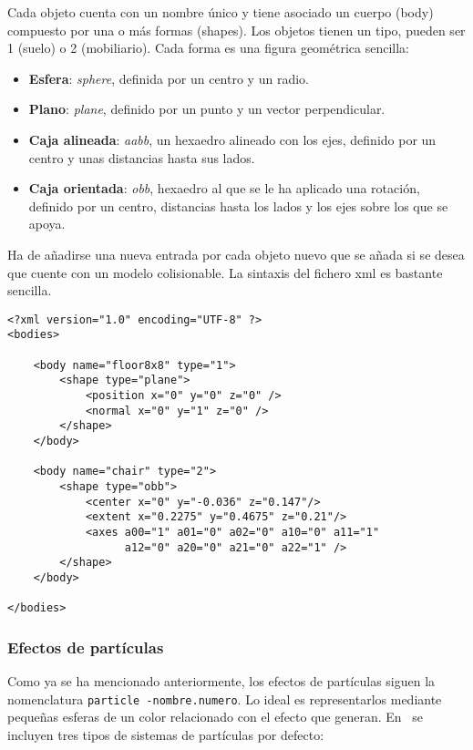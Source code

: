 Cada objeto cuenta con un nombre único y  tiene asociado un cuerpo (body)
compuesto por una o más formas (shapes). Los objetos tienen un tipo, pueden
ser 1 (suelo) o 2 (mobiliario). Cada forma es una figura geométrica
sencilla:

\begin{itemize}
    \itemsep0em
    \item \textbf{Esfera}: \textit{sphere}, definida por un centro y un
    radio.
    \item \textbf{Plano}: \textit{plane}, definido por un punto y un vector
    perpendicular.
    \item \textbf{Caja alineada}: \textit{aabb}, un hexaedro
    alineado con los ejes, definido por un centro y unas distancias hasta
    sus lados. 
    \item \textbf{Caja orientada}: \textit{obb}, hexaedro al que
    se le ha aplicado una rotación, definido por un centro, distancias
    hasta los lados y los ejes sobre los que se apoya.
\end{itemize}

Ha de añadirse una nueva entrada por cada objeto nuevo que se añada si se
desea que cuente con un modelo colisionable. La sintaxis del fichero
xml es bastante sencilla.

\begin{lstlisting}[style=xml]
<?xml version="1.0" encoding="UTF-8" ?>
<bodies>
    
    <body name="floor8x8" type="1">
        <shape type="plane">
            <position x="0" y="0" z="0" />
            <normal x="0" y="1" z="0" />
        </shape>
    </body>
    
    <body name="chair" type="2">
        <shape type="obb">
            <center x="0" y="-0.036" z="0.147"/>
            <extent x="0.2275" y="0.4675" z="0.21"/>
            <axes a00="1" a01="0" a02="0" a10="0" a11="1"
                  a12="0" a20="0" a21="0" a22="1" />
        </shape>
    </body>
    
</bodies>
\end{lstlisting}


\subsubsection*{Efectos de partículas}

Como ya se ha mencionado anteriormente, los efectos de partículas siguen
la nomenclatura \texttt{particle -nombre.numero}. Lo ideal es representarlos
mediante pequeñas esferas de un color relacionado con el efecto que generan.
En \juego\ se incluyen tres tipos de sistemas de partículas por defecto:

